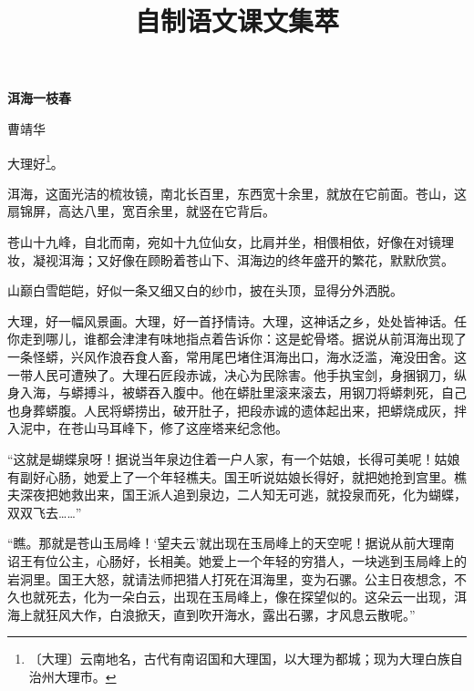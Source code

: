 \documentclass[12pt,UTF-8,openany]{ctexbook}
\title{\zihao{0} \bfseries 自制语文课文集萃}
\author{}
\date{}
\begin{document}

\begin{center}
    \begin{Huge}
        \textbf{洱海一枝春}
    \end{Huge}
    
    \vspace{8pt}
    曹靖华
    \vspace{8pt}

\end{center}

\begin{normalsize}
    
    大理好\footnote{〔大理〕云南地名，古代有南诏国和大理国，以大理为都城；现为大理白族自治州大理市。}。
    
    洱海，这面光洁的梳妆镜，南北长百里，东西宽十余里，就放在它前面。苍山，这扇锦屏，高达八里，宽百余里，就竖在它背后。
    
    苍山十九峰，自北而南，宛如十九位仙女，比肩并坐，相偎相依，好像在对镜理妆，凝视洱海；又好像在顾盼着苍山下、洱海边的终年盛开的繁花，默默欣赏。
    
    山巅白雪皑皑，好似一条又细又白的纱巾，披在头顶，显得分外洒脱。
    
    大理，好一幅风景画。大理，好一首抒情诗。大理，这神话之乡，处处皆神话。任你走到哪儿，谁都会津津有味地指点着告诉你：这是蛇骨塔。据说从前洱海出现了一条怪蟒，兴风作浪吞食人畜，常用尾巴堵住洱海出口，海水泛滥，淹没田舍。这一带人民可遭殃了。大理石匠段赤诚，决心为民除害。他手执宝剑，身捆钢刀，纵身入海，与蟒搏斗，被蟒吞入腹中。他在蟒肚里滚来滚去，用钢刀将蟒刺死，自己也身葬蟒腹。人民将蟒捞出，破开肚子，把段赤诚的遗体起出来，把蟒烧成灰，拌入泥中，在苍山马耳峰下，修了这座塔来纪念他。
    
    “这就是蝴蝶泉呀！据说当年泉边住着一户人家，有一个姑娘，长得可美呢！姑娘有副好心肠，她爱上了一个年轻樵夫。国王听说姑娘长得好，就把她抢到宫里。樵夫深夜把她救出来，国王派人追到泉边，二人知无可逃，就投泉而死，化为蝴蝶，双双飞去……”
    
    “瞧。那就是苍山玉局峰！‘望夫云’就出现在玉局峰上的天空呢！据说从前大理南诏王有位公主，心肠好，长相美。她爱上一个年轻的穷猎人，一块逃到玉局峰上的岩洞里。国王大怒，就请法师把猎人打死在洱海里，变为石骡。公主日夜想念，不久也就死去，化为一朵白云，出现在玉局峰上，像在探望似的。这朵云一出现，洱海上就狂风大作，白浪掀天，直到吹开海水，露出石骡，才风息云散呢。”
    

\end{normalsize}
\end{document}
